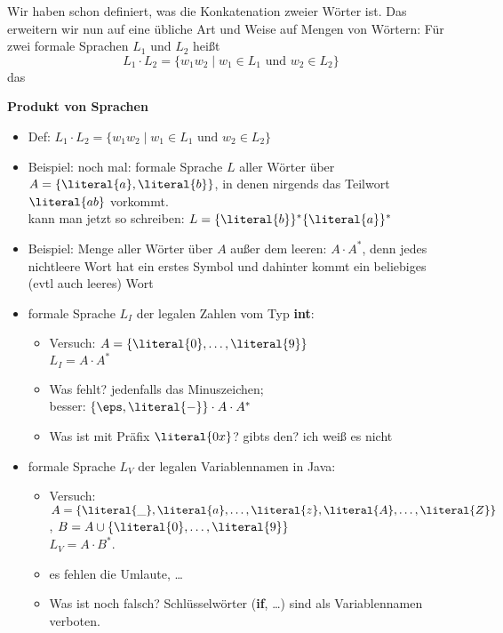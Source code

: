 Wir haben schon definiert, was die Konkatenation zweier Wörter ist. 
%
Das erweitern wir nun auf eine übliche Art und Weise auf Mengen von Wörtern:
Für zwei formale Sprachen $L_1$ und $L_2$ heißt
\[
L_1\cdot L_2=\{ w_1 w_2 \mid w_1\in L_1\text{ und } w_2\in L_2 \}
\]
das 
%
\begin{tutorium}
  \noindent\textbf{Produkt von Sprachen}
  \begin{itemize}
  \item Def: $L_1\cdot L_2 = \{w_1w_2 \mid w_1\in L_1 \text{ und } w_2\in L_2\}$
  \item Beispiel: noch mal: formale Sprache $L$ aller Wörter über
    $A=\{\literal{a},\literal{b}\}$, in denen nirgends das Teilwort
    $\literal{ab}$ vorkommt.\\
    kann man jetzt so schreiben: $L=\{\literal{b}\}^*\{\literal{a}\}^*$
  \item Beispiel: Menge aller Wörter über $A$ außer dem leeren: $A \cdot A^*$,
    denn jedes nichtleere Wort hat ein erstes Symbol und dahinter kommt ein
    beliebiges (evtl auch leeres) Wort
  \item formale Sprache $L_I$ der legalen Zahlen vom Typ \textbf{int}:
    \begin{itemize}
    \item Versuch:
      $A=\{\literal{0},\ldots,\literal{9}\}$ \\
      $L_I= A \cdot A^*$
    \item Was fehlt? jedenfalls das Minuszeichen; \\
      besser: $\{\eps,\literal{-}\}\cdot A \cdot A^*$
    \item Was ist mit Präfix $\literal{0x}$? gibts den? ich weiß es nicht 
    \end{itemize}
  \item formale Sprache $L_V$ der legalen Variablennamen in Java:
    \begin{itemize}
    \item Versuch:
      $A=\{\literal{\_},\literal{a},\ldots,\literal{z},\literal{A},\ldots,\literal{Z}\}$,
      $B=A \cup \{\literal{0},\ldots,\literal{9}\}$ \\
      $L_V= A \cdot B^*$.
    \item es fehlen die Umlaute, \dots
    \item Was ist noch falsch? \zB Schlüsselwörter (\textbf{if},
      \dots) sind als Variablennamen verboten. \\

\end{itemize}
\end{itemize}
\end{tutorium}
